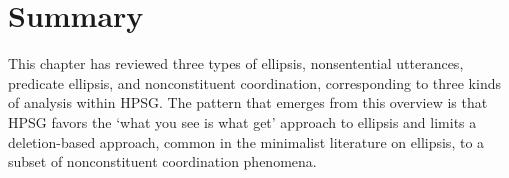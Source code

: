 \documentclass[output=paper
                ,modfonts
                ,nonflat
	        ,collection
	        ,collectionchapter
	        ,collectiontoclongg
 	        ,biblatex
                ,babelshorthands
                ,newtxmath
                ,draftmode
                ,colorlinks, citecolor=brown
]{./langsci/langscibook}
\begin{document}
\iffalse{

With these ingredients of the analysis in place, we reproduce the gapping construction in (\ref{66}). The construction represents asymmetric coordination in the sense that the daughters include both nonelliptical verbal conjuncts and head-fragment phrases with an underspecified syntactic category. The mother only shares its syntactic category with the nonelliptical conjuncts so that its own category is specified to be verbal.


\ea
\label{66}
Gapping construction\\
\type{gapping-ph} \impl \type{coord-ph} \&\\
\begin{avm}
\< \[HEAD \fbox{H} \type{verbal}\\
CNXT | BCKG \{ ..., sym-disc-rel(\fbox{M$_{1}$},..., \fbox{M$_{j}$}, \fbox{M$_{j+1}$},..., \fbox{M$_{n}$} ), ... \}\\

DTRS $\langle$ \[ HEAD \fbox{H} \[ verbal \\ CLUSTER elist \]\\CONT \fbox{M$_{1}$} \] ,..., \[
HEAD \fbox{H} \[ verbal \\ CLUSTER elist \]\\CONTENT \fbox{M$_{j}$} \]\] \> %
$\bigoplus$
\end{avm}
\begin{avm}
\<\[ HEAD \[CLUSTER $\langle \fbox{1},...,\fbox{n}\rangle$\] \\
             SOURCE \fbox{M$_{j}$}\\
             CONTENT \fbox{M$_{j+1}$} \],..., \[ HEAD \[CLUSTER $\langle$ \fbox{1$'$},...,\fbox{n$'$}$\rangle$\]\\
                                                SOURCE \fbox{M$_{j}$}\\
                                                CONTENT \fbox{M$_{n}$}\]\>%
\end{avm}
\z
}\fi



\section{Summary}
\label{sum}
This chapter has reviewed three types of ellipsis, nonsentential utterances, predicate ellipsis, and nonconstituent coordination, corresponding to three kinds of analysis within HPSG. The pattern that emerges from this overview is that HPSG favors the `what you see is what get' approach to ellipsis and limits a deletion-based approach, common in the minimalist literature on ellipsis, to a subset of nonconstituent coordination phenomena.
\end{document}
